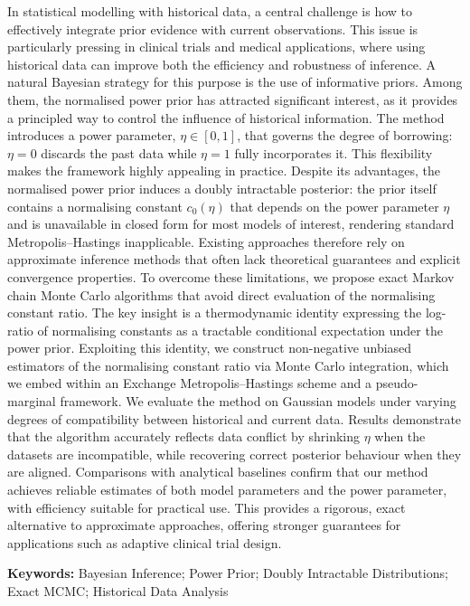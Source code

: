 In statistical modelling with historical data, a central challenge is how to effectively integrate prior evidence with current observations.
This issue is particularly pressing in clinical trials and medical applications, where using historical data can improve both the efficiency and robustness of inference.
A natural Bayesian strategy for this purpose is the use of informative priors.
Among them, the normalised power prior has attracted significant interest, as it provides a principled way to control the influence of historical information.
The method introduces a power parameter, $\eta \in [0, 1]$, that governs the degree of borrowing: $\eta = 0$ discards the past data while $\eta = 1$ fully incorporates it.
This flexibility makes the framework highly appealing in practice.
Despite its advantages, the normalised power prior induces a doubly intractable posterior: the prior itself contains a normalising constant $c_0(\eta)$ that depends on the power parameter $\eta$ and is unavailable in closed form for most models of interest, rendering standard Metropolis--Hastings inapplicable.
Existing approaches therefore rely on approximate inference methods that often lack theoretical guarantees and explicit convergence properties.
To overcome these limitations, we propose exact Markov chain Monte Carlo algorithms that avoid direct evaluation of the normalising constant ratio.
The key insight is a thermodynamic identity expressing the log-ratio of normalising constants as a tractable conditional expectation under the power prior.
Exploiting this identity, we construct non-negative unbiased estimators of the normalising constant ratio via Monte Carlo integration, which we embed within an Exchange Metropolis--Hastings scheme and a pseudo-marginal framework.
We evaluate the method on Gaussian models under varying degrees of compatibility between historical and current data.
Results demonstrate that the algorithm accurately reflects data conflict by shrinking $\eta$ when the datasets are incompatible, while recovering correct posterior behaviour when they are aligned.
Comparisons with analytical baselines confirm that our method achieves reliable estimates of both model parameters and the power parameter, with efficiency suitable for practical use.
This provides a rigorous, exact alternative to approximate approaches, offering stronger guarantees for applications such as adaptive clinical trial design.

\textbf{Keywords:} Bayesian Inference; Power Prior; Doubly Intractable Distributions; Exact MCMC; Historical Data Analysis